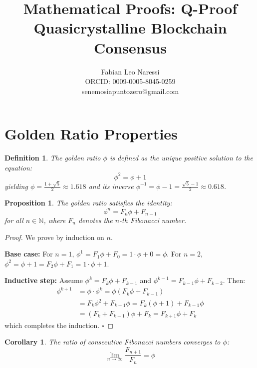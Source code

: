 \documentclass[12pt]{article}
\title{Mathematical Proofs: Q-Proof Quasicrystalline Blockchain Consensus}
\author{Fabian Leo Naressi\\
ORCID: 0009-0005-8045-0259\\
senemosiapuntozero@gmail.com}
\newtheorem lemma}[theorem]{Lemma}
\newtheorem{corollary}[theorem]{Corollary}
\newtheorem{definition}{Definition}
\newtheorem{prop}[theorem]{Proposition}
\begin{document}
\maketitle

\section{Golden Ratio Properties}

\begin{definition}
The golden ratio $\phi$ is defined as the unique positive solution to the equation:
\begin{equation}
\phi^2 = \phi + 1
\label{eq:phi_def}
\end{equation}
yielding $\phi = \frac{1+\sqrt{5}}{2} \approx 1.618$ and its inverse $\phi^{-1} = \phi - 1 = \frac{\sqrt{5}-1}{2} \approx 0.618$.
\end{definition}

\begin{prop}
The golden ratio satisfies the identity:
\begin{equation}
\phi^n = F_n \phi + F_{n-1}
\label{eq:phi_fib}
\end{equation}
for all $n \in \mathbb{N}$, where $F_n$ denotes the $n$-th Fibonacci number.
\end{prop}

\begin{proof}
We prove by induction on $n$.

\textbf{Base case:} For $n=1$, $\phi^1 = F_1\phi + F_0 = 1\cdot\phi + 0 = \phi$. For $n=2$, $\phi^2 = \phi + 1 = F_2\phi + F_1 = 1\cdot\phi + 1$.

\textbf{Inductive step:} Assume $\phi^k = F_k\phi + F_{k-1}$ and $\phi^{k-1} = F_{k-1}\phi + F_{k-2}$. Then:
\begin{align}
\phi^{k+1} &= \phi \cdot \phi^k = \phi(F_k\phi + F_{k-1}) \\
&= F_k\phi^2 + F_{k-1}\phi = F_k(\phi + 1) + F_{k-1}\phi \\
&= (F_k + F_{k-1})\phi + F_k = F_{k+1}\phi + F_k
\end{align}
which completes the induction. $\square$
\end{proof}

\begin{corollary}
The ratio of consecutive Fibonacci numbers converges to $\phi$:
\begin{equation}
\lim_{n\to\infty} \frac{F_{n+1}}{F_n} = \phi
\label{eq:fib_converge}
\end{equation}
\end{corollary}
\end{document}
